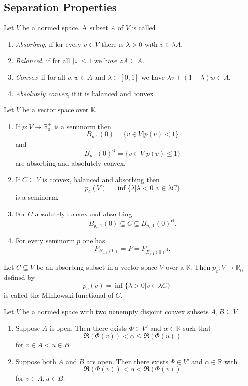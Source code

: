 \documentclass[prb,12pt]{revtex4-2}
\theoremstyle{definition}
\theoremstyle{definition}
\theoremstyle{definition}
\newenvironment{parts}{\begin{enumerate}[label=(\alph*)]}{\end{enumerate}}
\newcommand{\R}{\mathbb{R}}
\begin{document}
\subsection{Separation Properties}
\begin{Definition}
	Let $V$ be a normed space. A subset $A$ of $V$ is called
	\begin{parts}
	\item \emph{Absorbing}, if for every $v\in V$ there is $\lambda>0$ with $v\in \lambda A$.
	\item \emph{Balanced}, if for all $|z|\le 1$ we have $zA\subseteq A$.
	\item \emph{Convex}, if for all $v,w\in A$ and $\lambda\in [0,1]$ we have $\lambda v+(1-\lambda)w\in A$.
	\item \emph{Absolutely convex}, if it is balanced and convex.
	\end{parts}
\end{Definition}
\begin{Theorem}
	Let $V$ be a vector space over $\mathbb{K}$.
	\begin{parts}
	\item If $p:V \to \R_0^+$ is a seminorm then
		\[
			B_{p,1}(0)=\{v\in V|p(v)<1\} 
		\]
		and
		\[
			B_{p,1}(0)^\text{cl}=\{v\in V|p(v)\le 1\} 
		\]
		are absorbing and absolutely convex.
	\item If $C\subseteq V$ is convex, balanced and absorbing then
		\[
		p_c(V)=\inf \{\lambda| \lambda<0,v\in \lambda C\} 
	\]
	is a seminorm.
\item For $C$ absolutely convex and absorbing
	\[
		B_{p_c, 1}(0)\subseteq C \subseteq B_{p_c, 1}(0)^\text{cl}
	.\] 
\item For every seminorm $p$ one has
	\[
		P_{B_{p, 1}(0)}=P=P_{B_{p,1}(0)^\text{cl}}
	.\] 
	\end{parts}
\end{Theorem}
\begin{Definition}
	Let $C\subseteq V$ be an absorbing subset in a vector space $V$ over a $\mathbb{K}$. Then $p_c:V\to \R_0^+$ defined by
	\[
	p_c(v)=\inf \{\lambda>0|v\in \lambda C\} 
\]
is called the Minkowski functional of $C$.
\end{Definition}
\begin{Theorem}[Separation I]
	Let $V$ be a normed space with two nonempty disjoint convex subsets $A,B\subseteq V$.
	\begin{parts}
	\item Suppose $A$ is open. Then there exists $\Phi\in V'$ and $\alpha\in \R$ such that
		\[
		\Re(\Phi(v))<\alpha\le \Re(\Phi(u))
	\]
	for $v\in A< u\in B$
\item Suppose both $A$ and $B$ are open. Then there exists $\Phi\in V'$ and $\alpha\in \R$ with
	\[
	\Re(\Phi(v))<\alpha<\Re(\Phi(v))
\]
for $v\in A, u\in B$.
	\end{parts}
\end{Theorem}
\end{document}
